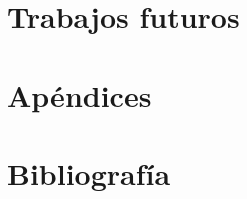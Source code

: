 \documentclass[a4paper,11pt,final]{book}
\begin{document}
\part{Trabajos futuros}

\part{Apéndices}
\appendix






\newpage
\part{Bibliografía}



\end{document}
